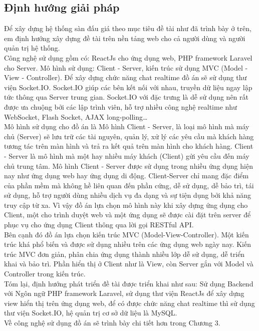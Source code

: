 \documentclass{article}
\begin{document}
\subsection{Định hướng giải pháp}
Để xây dựng hệ thống sàn đấu giá theo mục tiêu đề tài như đã trình bày ở trên, em định hướng xây dựng đề tài trên nền tảng web cho cả người dùng và người quản trị hệ thống. \\
Công nghệ sử dụng gồm có: ReactJs cho ứng dụng web, PHP framework Laravel cho Server. Mô hình sử dụng: Client - Server, kiến trúc sử dụng MVC (Model - View - Controller). Để xây dựng chức năng chat realtime đồ án sẽ sử dụng thư viện Socket.IO. Socket.IO giúp các bên kết nối với nhau, truyền dữ liệu ngay lập tức thông qua Server trung gian. Socket.IO với đặc trưng là dễ sử dụng nên rất được ưa chuộng bởi các lập trình viên, hỗ trợ  nhiều công nghệ realtime như WebSocket, Flash Socket, AJAX long-polling…\\
Mô hình sử dụng cho đồ án là Mô hình Client  - Server, là loại mô hình mà máy chủ (Server) sẽ lưu trữ các tài nguyên, quản lý,  xử lý các yêu cầu mà khách hàng tương tác trên màn hình và trả ra kết quả trên màn hình cho khách hàng. Client  - Server là mô hình mà một hay nhiều máy khách (Client) gửi yêu cầu đến máy chủ trung tâm. Mô hình Client - Server được sử dụng trong nhiều ứng dụng hiện nay như ứng dụng web hay ứng dụng di động. Client-Server chỉ mang đặc điểm của phần mềm mà không hề liên quan đến phần cứng, dễ sử dụng, dễ bảo trì, tái sử dụng, hỗ trợ người dùng nhiều dịch vụ đa dạng và sự tiện dụng bởi khả năng truy cập từ xa. Vì vậy đồ án lựa chọn mô hình này khi xây dựng ứng dụng cho Client, một cho trình duyệt web và một ứng dụng sẽ được cài đặt trên server để phục vụ cho ứng dụng Client thông qua lời gọi RESTful API. \\
Bên cạnh đó đồ án lựa chọn kiến trúc MVC (Model-View-Controller). Một kiến trúc khá phổ biến và được sử dụng nhiều trên các ứng dụng web ngày nay. Kiến trúc MVC đơn giản, phân chia ứng dụng thành nhiều lớp dễ sử dụng, dễ triển khai và bảo trì. Phần hiển thị ở Client như là View, còn Server gắn với Model và Controller trong kiến trúc.\\
Tóm lại, định hướng phát triển đề tài được triển khai như sau: Sử dụng Backend với Ngôn ngữ PHP framework Laravel, sử dụng thư viện ReactJs để xây dựng view hiển thị trên ứng dụng web, để có được chức năng chat realtime thì sử dụng thư viện Socket.IO, hệ quản trị cơ sở dữ liệu là MySQL. \\
Về công nghệ sử dụng đồ án sẽ trình bày chi tiết hơn trong Chương 3.
\end{document}

